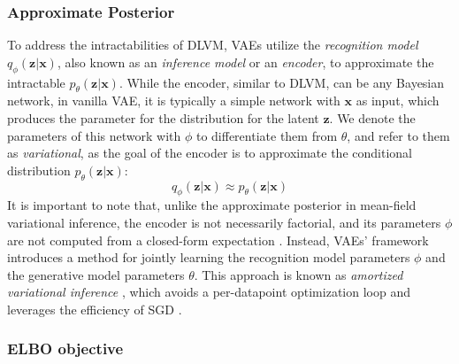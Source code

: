 \subsubsection{Approximate Posterior}
\label{subsubsec:vae_encoder}
To address the intractabilities of DLVM, VAEs utilize the \textit{recognition model} $q_\phi(\mathbf{z}|\mathbf{x})$, also known as an 
\textit{inference model} or an \textit{encoder}, to approximate the intractable $p_\theta(\mathbf{z}|\mathbf{x})$. While the encoder, similar 
to DLVM, can be any Bayesian network, in vanilla VAE, it is typically a simple network with $\mathbf{x}$ as input, which produces the parameter for
the distribution for the latent $\mathbf{z}$. We denote the parameters of this network with $\phi$ to differentiate them from $\theta$, and refer
to them as \textit{variational}, as the goal of the encoder is to approximate the conditional distribution $p_\theta(\mathbf{z}|\mathbf{x})$:
$$
q_\phi(\mathbf{z}|\mathbf{x}) \approx p_\theta(\mathbf{z}|\mathbf{x})
$$
It is important to note that, unlike the approximate posterior in mean-field variational inference, the encoder is not necessarily factorial, and
its parameters $\phi$ are not computed from a closed-form expectation \cite{vae-original-2013}. Instead, VAEs' framework introduces a method for 
jointly learning the recognition model parameters $\phi$ and the generative model parameters $\theta$.  This approach is known as \textit{amortized 
variational inference} \cite{amortized-inference-2014}, which avoids a per-datapoint optimization loop and leverages the efficiency of SGD \cite{intro-vae-2019}.
\subsubsection{ELBO objective}


